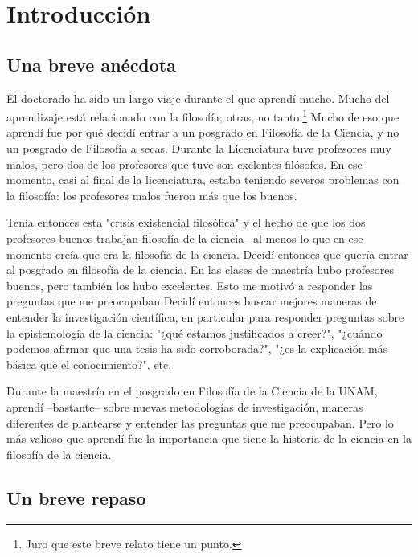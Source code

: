 
\chapter{Introducción}
\label{ch:introduction}


\section{Una breve anécdota}

\noindent El doctorado ha sido un largo viaje durante el que aprendí mucho.
Mucho del aprendizaje está relacionado con la filosofía; otras, no tanto.\footnote{Juro que este breve relato tiene un punto.}
Mucho de eso que aprendí fue por qué decidí entrar a un posgrado en Filosofía de la Ciencia, y no un posgrado de Filosofía a secas.
Durante la Licenciatura tuve profesores muy malos, pero dos de los profesores que tuve son exclentes filósofos.
En ese momento, casi al final de la licenciatura, estaba teniendo severos problemas con la filosofía: los profesores malos fueron más que los buenos.

Tenía entonces esta "crisis existencial filosófica" y el hecho de que los dos profesores buenos trabajan filosofía de la ciencia --al menos lo que en ese momento creía que era la filosofía de la ciencia.
Decidí entonces que quería entrar al posgrado en filosofía de la ciencia.
En las clases de maestría hubo profesores buenos, pero también los hubo excelentes.
Esto me motivó a responder las preguntas que me preocupaban
Decidí entonces buscar mejores maneras de entender la investigación científica, en particular para responder preguntas sobre la epistemología de la ciencia: "¿qué estamos justificados a creer?", "¿cuándo podemos afirmar que una tesis ha sido corroborada?", "¿es la explicación más básica que el conocimiento?", etc.

Durante la maestría en el posgrado en Filosofía de la Ciencia de la UNAM, aprendí --bastante-- sobre nuevas metodologías de investigación, maneras diferentes de plantearse y entender las preguntas que me preocupaban.
Pero lo más valioso que aprendí fue la importancia que tiene la historia de la ciencia en la filosofía de la ciencia.



\section{Un breve repaso}

